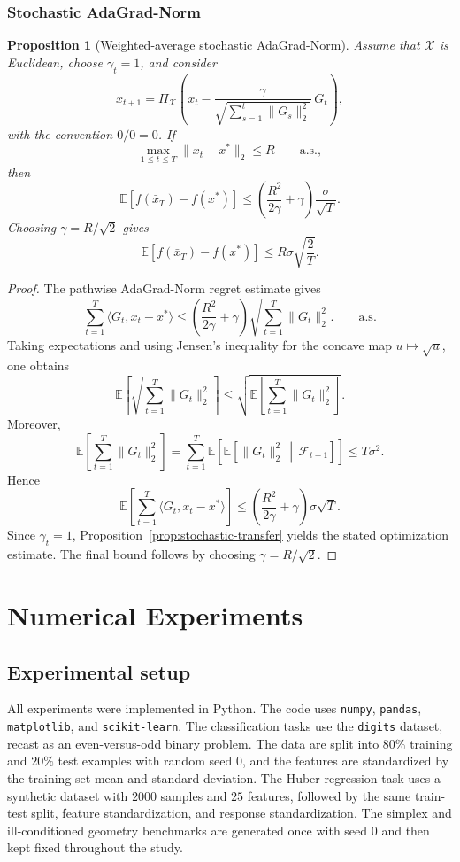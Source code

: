 \documentclass[11pt]{article}
\newtheorem{proposition}[theorem]{Proposition}
\theoremstyle{definition}
\theoremstyle{remark}
\newcommand{\X}{\mathcal{X}}
\newcommand{\E}{\mathbb{E}}
\newcommand{\inner}[2]{\langle #1, #2 \rangle}
\newcommand{\norm}[1]{\lVert #1 \rVert}
\begin{document}
\subsubsection{Stochastic AdaGrad-Norm}

\begin{proposition}[Weighted-average stochastic AdaGrad-Norm]
\label{prop:stochastic-adagrad}
Assume that $\X$ is Euclidean, choose $\gamma_t=1$, and consider
\[
    x_{t+1}
    =
    \Pi_{\X}\left(
        x_t - \frac{\gamma}{\sqrt{\sum_{s=1}^t \norm{G_s}_2^2}}\,G_t
    \right),
\]
with the convention $0/0=0$. If
\[
    \max_{1\le t\le T} \norm{x_t-x^*}_2 \le R
    \qquad\text{a.s.},
\]
then
\[
    \E[f(\bar{x}_T)-f(x^*)]
    \le
    \left(
        \frac{R^2}{2\gamma} + \gamma
    \right)\frac{\sigma}{\sqrt{T}}.
\]
Choosing $\gamma=R/\sqrt{2}$ gives
\[
    \E[f(\bar{x}_T)-f(x^*)] \le R\sigma\sqrt{\frac{2}{T}}.
\]
\end{proposition}

\begin{proof}
The pathwise AdaGrad-Norm regret estimate gives
\[
    \sum_{t=1}^T \inner{G_t}{x_t-x^*}
    \le
    \left(
        \frac{R^2}{2\gamma} + \gamma
    \right)\sqrt{\sum_{t=1}^T \norm{G_t}_2^2}.
    \qquad\text{a.s.}
\]
Taking expectations and using Jensen's inequality for the concave map $u \mapsto \sqrt{u}$, one obtains
\[
    \E\!\left[\sqrt{\sum_{t=1}^T \norm{G_t}_2^2}\right]
    \le
    \sqrt{\E\!\left[\sum_{t=1}^T \norm{G_t}_2^2\right]}.
\]
Moreover,
\[
    \E\!\left[\sum_{t=1}^T \norm{G_t}_2^2\right]
    =
    \sum_{t=1}^T \E\!\left[\E\!\left[\norm{G_t}_2^2 \,\middle|\, \mathcal{F}_{t-1}\right]\right]
    \le
    T\sigma^2.
\]
Hence
\[
    \E\left[
        \sum_{t=1}^T \inner{G_t}{x_t-x^*}
    \right]
    \le
    \left(
        \frac{R^2}{2\gamma} + \gamma
    \right)\sigma\sqrt{T}.
\]
Since $\gamma_t=1$, Proposition~\ref{prop:stochastic-transfer} yields the stated optimization estimate. The final bound follows by choosing $\gamma=R/\sqrt{2}$.
\end{proof}


\section{Numerical Experiments}
\label{sec:experiments}

\subsection{Experimental setup}
All experiments were implemented in Python. The code uses \texttt{numpy}, \texttt{pandas}, \texttt{matplotlib}, and \texttt{scikit-learn}. The classification tasks use the \texttt{digits} dataset, recast as an even-versus-odd binary problem. The data are split into $80\%$ training and $20\%$ test examples with random seed $0$, and the features are standardized by the training-set mean and standard deviation. The Huber regression task uses a synthetic dataset with $2000$ samples and $25$ features, followed by the same train-test split, feature standardization, and response standardization. The simplex and ill-conditioned geometry benchmarks are generated once with seed $0$ and then kept fixed throughout the study.
\end{document}
